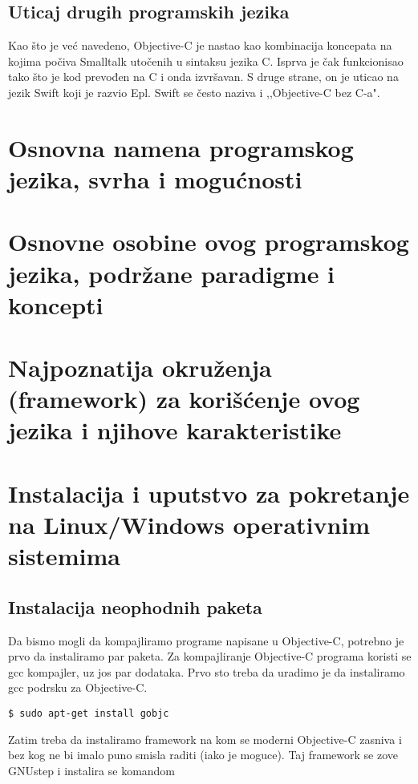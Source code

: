 \documentclass[a4paper]{article}
\begin{document}
\subsection{Uticaj drugih programskih jezika}
\label{subsec:uticaj}
Kao što je već navedeno, Objective-C je nastao kao kombinacija koncepata na kojima počiva Smalltalk utočenih u sintaksu jezika C. Isprva je čak funkcionisao tako što je kod prevođen na C i onda izvršavan. S druge strane, on je uticao na jezik Swift koji je razvio Epl. Swift se često naziva i ,,Objective-C bez C-a". 

\section{Osnovna namena programskog jezika, svrha i mogućnosti}
\label{sec:namena}

\section{Osnovne osobine ovog programskog jezika, podržane paradigme i koncepti}
\label{sec:osobine}

\section{Najpoznatija okruženja (framework) za korišćenje ovog jezika i njihove karakteristike}
\label{sec:okruzenja}

\section{Instalacija i uputstvo za pokretanje na Linux/Windows operativnim sistemima}
\label{sec:instalacija}
\subsection{Instalacija neophodnih paketa}
Da bismo mogli da kompajliramo programe napisane u Objective-C, potrebno je prvo da instaliramo
par paketa. Za kompajliranje Objective-C programa koristi se gcc kompajler, uz jos par
dodataka.
Prvo sto treba da uradimo je da instaliramo gcc podrsku za Objective-C.

\begin{lstlisting}[frame=single]
$ sudo apt-get install gobjc
\end{lstlisting}

Zatim treba da instaliramo framework na kom se moderni Objective-C zasniva i bez kog
ne bi imalo puno smisla raditi (iako je moguce).
Taj framework se zove GNUstep i instalira se komandom
\end{document}
